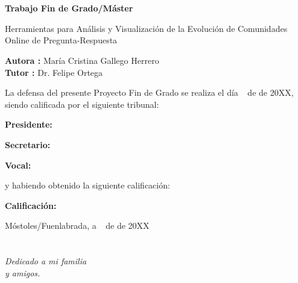 \documentclass[a4paper, 12pt]{book}
\begin{document}
\newpage
\mbox{}
\thispagestyle{empty} %


\clearpage
{}
\chapter*{}

\vspace{-4cm}
\begin{center}
\LARGE
\textbf{Trabajo Fin de Grado/Máster}

\vspace{1cm}
\large
Herramientas para Análisis y Visualización de la Evolución de Comunidades Online de Pregunta-Respuesta

\vspace{1cm}
\large
\textbf{Autora :} María Cristina Gallego Herrero  \\
\textbf{Tutor :} Dr. Felipe Ortega 

\end{center}

\vspace{1cm}
La defensa del presente Proyecto Fin de Grado se realiza el día \qquad$\;\,$ de
\qquad\qquad\qquad\qquad \newline de 20XX, siendo calificada por el siguiente tribunal:


\vspace{0.5cm}
\textbf{Presidente:}

\vspace{0.8cm}
\textbf{Secretario:}

\vspace{0.8cm}
\textbf{Vocal:}


\vspace{0.8cm}
y habiendo obtenido la siguiente calificación:

\vspace{0.8cm}
\textbf{Calificación:}


\vspace{0.8cm}
\begin{flushright}
Móstoles/Fuenlabrada, a \qquad$\;\,$ de \qquad\qquad\qquad\qquad de 20XX
\end{flushright}


\chapter*{}
\begin{flushright}
\textit{Dedicado a mi familia \\
y amigos.}
\end{flushright}
\end{document}
